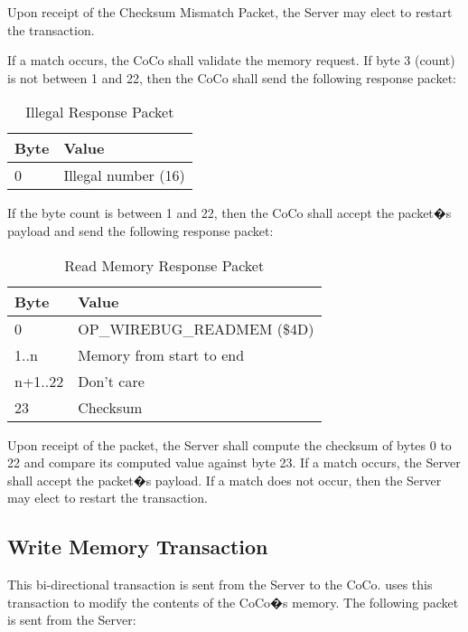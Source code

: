 \documentclass{article}
\begin{document}
Upon receipt of the Checksum Mismatch Packet, the Server may elect to restart the transaction.

If a match occurs, the CoCo shall validate the memory request. If byte 3 (count) is not between 1 and 22, then the CoCo shall send the following response packet:

\begin{table}[ht]
\caption{Illegal Response Packet}
\begin{center}
\begin{tabular}{|ll|}
\hline
Byte & Value \\ \hline
0 & Illegal number (16) \\
\hline
\end{tabular}
\end{center}
\end{table}

If the byte count is between 1 and 22, then the CoCo shall accept the packet�s payload and send the following response packet:

\begin{table}[ht]
\caption{Read Memory Response Packet}
\begin{center}
\begin{tabular}{|ll|}
\hline
Byte & Value \\ \hline
0 & OP\_WIREBUG\_READMEM (\$4D) \\
1..n & Memory from start to end \\
n+1..22 & Don't care \\
23 & Checksum \\
\hline
\end{tabular}
\end{center}
\end{table}

Upon receipt of the packet, the Server shall compute the checksum of bytes 0 to 22 and compare its computed value against byte 23.	If a match occurs, the Server shall accept the packet�s payload.	If a match does not occur, then the Server may elect to restart the transaction.

\subsection{Write Memory Transaction}
This bi-directional transaction is sent from the Server to the CoCo. uses this transaction to modify the contents of the CoCo�s memory.
The following packet is sent from the Server:
\end{document}
